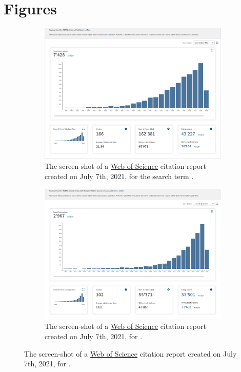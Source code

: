 \section{Figures}
\label{app:figures}
\begin{figure}[!h]
\centering
    \begin{subfigure}[b]{0.73\textwidth}
        \centering
        \includegraphics[width = \textwidth]{figures/Internet_addiction.png}
        \caption{The screen-shot of a \href{https://apps.webofknowledge.com/}{Web of Science} citation report created on July 7th, 2021, for the search term .}
        \label{fig:internet_addiction}
    \end{subfigure}
    \begin{subfigure}[b]{0.73\textwidth}
        \centering
    \includegraphics[width = \textwidth]{figures/Social_media_addiction.png}
    \caption{The screen-shot of a \href{https://apps.webofknowledge.com/}{Web of Science} citation report created on July 7th, 2021, for .}
    \label{fig:sns_addiction}
    \end{subfigure}
\end{figure}

